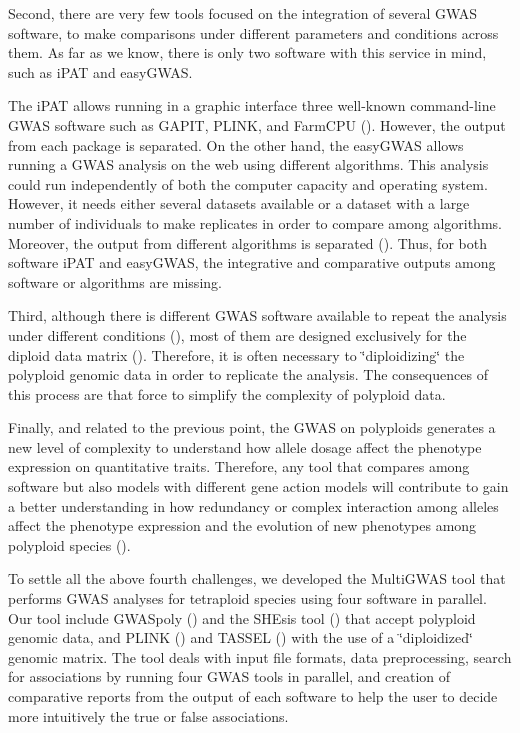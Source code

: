 \documentclass{article}
\begin{document}
Second, there are very few tools focused on the integration of several GWAS software, to make comparisons under different parameters and conditions across them. As far as we know, there is only two software with this service in mind, such as iPAT and easyGWAS.

The iPAT allows running in a graphic interface three well-known command-line GWAS software such as GAPIT, PLINK, and FarmCPU (\cite{Zhang2018}). However, the output from each package is separated. On the other hand, the easyGWAS allows running a GWAS analysis on the web using different algorithms. This analysis could run independently of both the computer capacity and operating system. However, it needs either several datasets available or a dataset with a large number of individuals to make replicates in order to compare among algorithms. Moreover, the output from different algorithms is separated (\cite{Grimm2017}). Thus, for both software iPAT and easyGWAS, the integrative and comparative outputs among software or algorithms are missing.



Third, although there is different GWAS software available to repeat the analysis under different conditions (\cite{Gumpinger2018}), most of them are designed exclusively for the diploid data matrix (\cite{Bourke2018}). Therefore, it is often necessary to \char`\"{}diploidizing\char`\"{} the polyploid genomic data in order to replicate the analysis. The consequences of this process are that force to simplify the complexity of polyploid data. 

Finally, and related to the previous point, the GWAS on polyploids generates a new level of complexity to understand how allele dosage affect the phenotype expression on quantitative traits. Therefore, any tool that compares among software but also models with different gene action models will contribute to gain a better understanding in how redundancy or complex interaction among alleles affect the phenotype expression and the evolution of new phenotypes among polyploid species (\cite{Bourke2018, Rosyara2016, Ferrao2018}). 

To settle all the above fourth challenges, we developed the MultiGWAS tool that performs GWAS analyses for tetraploid species using four software in parallel. Our tool include GWASpoly (\cite{Rosyara2016}) and the SHEsis tool (\cite{Shen2016}) that accept polyploid genomic data, and PLINK (\cite{Purcell2007}) and TASSEL (\cite{Bradbury2007}) with the use of a \char`\"{}diploidized\char`\"{} genomic matrix. The tool deals with input file formats, data preprocessing, search for associations by running four GWAS tools in parallel, and creation of comparative reports from the output of each software to help the user to decide more intuitively the true or false associations.
\end{document}
